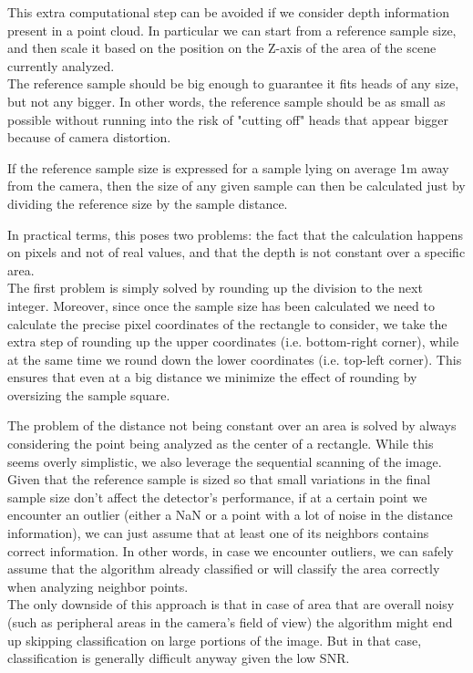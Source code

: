 \documentclass[a4paper,11pt,titlepage]{article}
\begin{document}
This extra computational step can be avoided if we consider depth information
present in a point cloud. In particular we can start from a reference sample
size, and then scale it based on the position on the Z-axis of the area of the
scene currently analyzed. \\
The reference sample should be big enough to guarantee it fits heads of any
size, but not any bigger. In other words, the reference sample should be as
small as possible without running into the risk of "cutting off" heads that
appear bigger because of camera distortion.

If the reference sample size is expressed for a sample lying on average 1m away
from the camera, then the size of any given sample can then be calculated just
by dividing the reference size by the sample distance.

In practical terms, this poses two problems: the fact that the calculation
happens on pixels and not of real values, and that the depth is not constant
over a specific area. \\
The first problem is simply solved by rounding up the division to the next
integer. Moreover, since once the sample size has been calculated we need to
calculate the precise pixel coordinates of the rectangle to consider, we take
the extra step of rounding up the upper coordinates (i.e. bottom-right corner),
while at the same time we round down the lower coordinates (i.e. top-left
corner). This ensures that even at a big distance we minimize the effect of
rounding by oversizing the sample square.

The problem of the distance not being constant over an area is solved by always
considering the point being analyzed as the center of a rectangle. While this
seems overly simplistic, we also leverage the sequential scanning of the image.
Given that the reference sample is sized so that small variations in the final
sample size don't affect the detector's performance, if at a certain point we
encounter an outlier (either a NaN or a point with a lot of noise in the
distance information), we can just assume that at least one of its neighbors
contains correct information. In other words, in case we encounter outliers, we
can safely assume that the algorithm already classified or will classify the
area correctly when analyzing neighbor points. \\
The only downside of this approach is that in case of area that are overall
noisy (such as peripheral areas in the camera's field of view) the algorithm
might end up skipping classification on large portions of the image. But in that
case, classification is generally difficult anyway given the low SNR.
\end{document}
